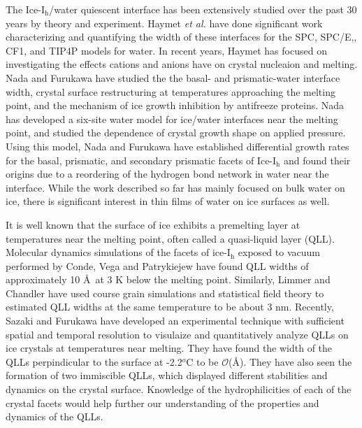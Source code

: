 \documentclass{pnastwo}
\begin{document}
\begin{article}
The Ice-I$_\mathrm{h}$/water quiescent interface has been extensively studied 
over the past 30 years by theory and experiment. Haymet \emph{et al.} have 
done significant work characterizing and quantifying the width of these 
interfaces for the SPC,\cite{Karim90} SPC/E,\cite{Gay02,Bryk02}, 
CF1,\cite{Hayward01,Hayward02} and TIP4P\cite{Karim88} models for water. In 
recent years, Haymet has focused on investigating the effects cations and 
anions have on crystal nucleaion and 
melting.\cite{Bryk04,Smith05,Wilson08,Wilson10} Nada and Furukawa have studied
the the basal- and prismatic-water interface width\cite{Nada95}, crystal 
surface restructuring at temperatures approaching the melting 
point\cite{Nada00}, and the mechanism of ice growth inhibition by antifreeze 
proteins\cite{Nada08,Nada11,Nada12}. Nada has developed a six-site water model
for ice/water interfaces near the melting point\cite{Nada03}, and studied the 
dependence of crystal growth shape on applied pressure\cite{Nada11b}. Using 
this model, Nada and Furukawa have established differential 
growth rates for the basal, prismatic, and secondary prismatic facets of 
Ice-I$_\mathrm{h}$ and found their origins due to a reordering of the hydrogen 
bond network in water near the interface\cite{Nada05}. While the work 
described so far has mainly focused on bulk water on ice, there is significant
interest in thin films of water on ice surfaces as well.  

It is well known that the surface of ice exhibits a premelting layer at 
temperatures near the melting point, often called a quasi-liquid layer (QLL).
Molecular dynamics simulations of the facets of ice-I$_\mathrm{h}$ exposed
to vacuum performed by Conde, Vega and Patrykiejew have found QLL widths of
approximately 10 \AA\ at 3 K below the melting point\cite{Conde08}.
Similarly, Limmer and Chandler have used course grain simulations and 
statistical field theory to estimated QLL widths at the same temperature to
be about 3 nm\cite{Limmer14}.
Recently, Sazaki and Furukawa have developed an experimental technique with 
sufficient spatial and temporal resolution to visulaize and quantitatively
analyze QLLs on ice crystals at temperatures near melting\cite{Sazaki10}. They 
have found the width of the QLLs perpindicular to the surface  at -2.2$^{o}$C 
to be $\mathcal{O}$(\AA). They have also seen the formation of two immiscible
QLLs, which displayed different stabilities and dynamics on the crystal 
surface\cite{Sazaki12}. Knowledge of the hydrophilicities of each
of the crystal facets would help further our understanding of the properties 
and dynamics of the QLLs.
  

\end{article}
\end{document}
